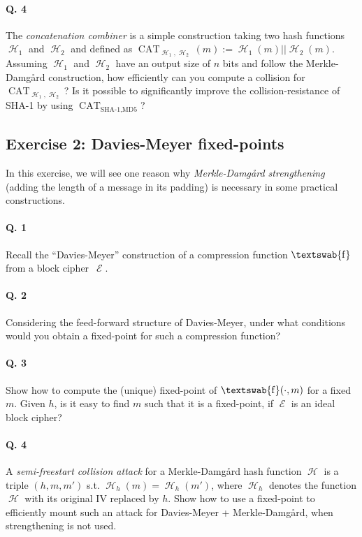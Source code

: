 \documentclass[11pt,a4paper]{article}
\DeclareMathOperator\hash{\mathcal{H}}
\DeclareMathOperator\E{\mathcal{E}}
\DeclareMathOperator\comp{\textswab{f}}
\DeclareMathOperator\cat{\mathrm{CAT}}
\begin{document}
\paragraph{Q. 4} The \emph{concatenation combiner} is a simple construction taking two hash functions $\hash_1$ and $\hash_2$ and defined as
$\cat_{\hash_1,\hash_2}(m) := \hash_1(m)||\hash_2(m)$. Assuming $\hash_1$ and $\hash_2$ have an output size of $n$ bits and follow the Merkle-Damg\aa rd construction,
how efficiently can you compute a collision for $\cat_{\hash_1, \hash_2}$? Is it possible to significantly improve the collision-resistance of SHA-1 by using
$\cat_{\text{SHA-1}, \text{MD5}}$?


\subsection*{Exercise 2: Davies-Meyer fixed-points}
In this exercise, we will see one reason why \emph{Merkle-Damg\aa rd strengthening} (adding the length of a message in its padding) is necessary
in some practical constructions.

\paragraph{Q. 1} Recall the ``Davies-Meyer'' construction of a compression function $\comp$ from a block cipher~$\E$.

\paragraph{Q. 2} Considering the feed-forward structure of Davies-Meyer, under what conditions would you obtain a fixed-point for such a compression function?

\paragraph{Q. 3} Show how to compute the (unique) fixed-point of $\comp(\cdot,m)$ for a fixed $m$. Given $h$, is it easy to find $m$ such that it is a fixed-point,
if $\E$ is an ideal block cipher?

\paragraph{Q. 4} A \emph{semi-freestart collision attack} for a Merkle-Damg\aa rd hash function $\hash$ is a triple $(h, m, m')$ s.t. $\hash_h(m) = \hash_h(m')$,
where $\hash_h$ denotes the function $\hash$ with its original IV replaced by $h$.
Show how to use a fixed-point to efficiently mount such an attack for Davies-Meyer + Merkle-Damg\aa rd, when strengthening is not used.
\end{document}
